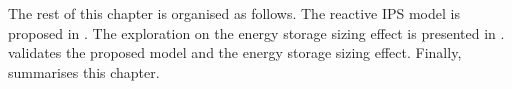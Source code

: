 The rest of this chapter is organised as follows. 
The reactive IPS model is proposed in .
The exploration on the energy storage sizing effect is presented in .
 validates the proposed model and the energy storage sizing effect. 
Finally,  summarises this chapter. 




